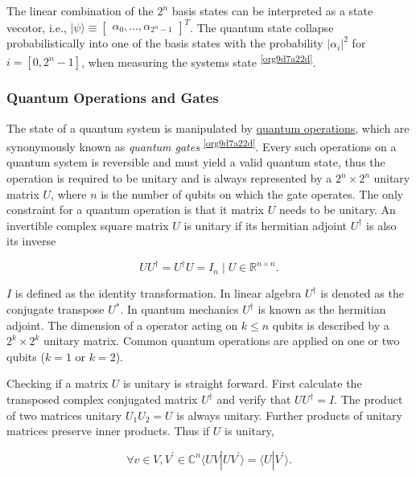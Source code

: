 \documentclass[11pt]{article}
\providecommand{\ket}[1]{|#1\rangle}
\providecommand{\braket}[2]{\langle#1|#2\rangle}
\newcommand{\myvec}[1]{\ensuremath{\begin{bmatrix}#1\end{bmatrix}}}
\renewcommand{\leq}{\leqslant}
\theoremstyle{definition}
\theoremstyle{definition}
\begin{document}
The linear combination of the \(2^n\) basis states can be interpreted as a state vecotor, i.e.,
\(\ket{\psi} \equiv \myvec{\alpha_0, \ldots, \alpha_{2^n -1}}^T\).
The quantum state collapse probabilistically into one of the basis states
with the probability \(|\alpha_i|^2\) for \(i = [0, 2^n -1]\),
when measuring the systems state \textsuperscript{\ref{org9d7a22d}}.

\subsubsection{Quantum Operations and Gates}
\label{sec:org16622b6}
The state of a quantum system is manipulated by \hyperref[sec:org60ff678]{quantum operations},
which are synonymously known as \emph{quantum gates} \textsuperscript{\ref{org9d7a22d}}.
Every such operations on a quantum system is reversible and must yield a
valid quantum state, thus the operation is required to be unitary and is
always represented by a \(2^n \times 2^n\) unitary matrix \(U\), where \(n\) is
the number of qubits on which the gate operates.
The only constraint for a quantum operation is that it matrix \(U\) needs to
be unitary. An invertible complex square matrix \(U\) is unitary if its
hermitian adjoint \(U^\dagger\) is also its inverse

\begin{equation}
U U^\dagger = U^\dagger U = I_n \mid U \in \mathbb{R}^{n \times n}.
\end{equation}

\(I\) is defined as the identity transformation.
In linear algebra \(U^\dagger\) is denoted as the conjugate transpose \(U^*\).
In quantum mechanics \(U^\dagger\) is known as the hermitian adjoint.
The dimension of a operator acting on \(k \leq n\) qubits is described by a
\(2^k \times 2^k\) unitary matrix. Common quantum operations are applied on
one or two qubits (\(k = 1\) or \(k= 2\)).

Checking if a matrix \(U\) is unitary is straight forward.
First calculate the transposed complex conjugated matrix \(U^\dagger\) and
verify that \(U  U^\dagger = I\).
The product of two matrices unitary \(U_1 U_2 = U\) is always unitary.
Further products of unitary matrices preserve inner products.
Thus if \(U\) is unitary,

\begin{equation}
\forall v \in {V, V^\prime} \in \mathbb{C}^n \braket{UV}{UV^\prime} = \braket{U}{V^\prime}.
\end{equation}
\end{document}
